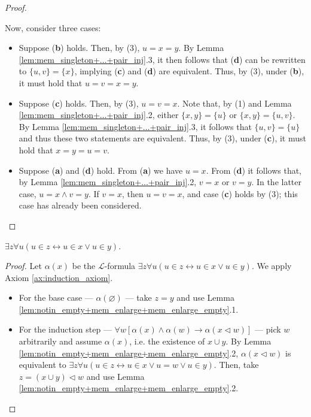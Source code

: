 \begin{proof}
\begin{enumerate}
        Now, consider three cases:
        \begin{itemize}
            \item Suppose (\textbf{b}) holds. Then, by (3), $u=x=y$. 
            By Lemma \ref{lem:mem_singleton+...+pair_inj}.3, it then follows that 
            (\textbf{d}) can be rewritten to $\{u,v\}=\{x\}$, 
            implying (\textbf{c}) and (\textbf{d}) are equivalent.
            Thus, by (3), under (\textbf{b}), it must hold that $u=v=x=y$.
            \item Suppose (\textbf{c}) holds. 
            Then, by (3), $u=v=x$. 
            Note that, by (1) and Lemma \ref{lem:mem_singleton+...+pair_inj}.2, 
            either $\{x,y\}=\{u\}$ or $\{x,y\}=\{u,v\}$.  
            By Lemma \ref{lem:mem_singleton+...+pair_inj}.3, it follows that $\{u,v\}=\{u\}$ and 
            thus these two statements are equivalent. 
            Thus, by (3), under (\textbf{c}), it must hold that $x=y=u=v$.
            \item Suppose (\textbf{a}) and (\textbf{d}) hold. From (\textbf{a}) we have $u=x$. 
            From (\textbf{d}) it follows that, by 
            Lemma \ref{lem:mem_singleton+...+pair_inj}.2, $v=x$ or $v=y$. 
            In the latter case, $u=x\land v=y$. 
            If $v=x$, then $u=v=x$, and case (\textbf{c}) holds by (3); 
            this case has already been considered.
        \end{itemize}
    \end{enumerate}
\end{proof}

\begin{theorem}
    \label{thm:exists_union}
    \leanok
    $\exists z \forall u (u \in z \leftrightarrow u \in x \lor u \in y)$.
\end{theorem}

\begin{proof}
    \leanok
    Let $\alpha (x)$ be the $\mathcal{L}$-formula 
    $\exists z \forall u (u \in z \leftrightarrow u \in x \lor u \in y)$.
    We apply Axiom \ref{ax:induction_axiom}.
    \begin{itemize}
        \item For the base case — $\alpha (\varnothing)$ — take $z=y$ and use 
        Lemma \ref{lem:notin_empty+mem_enlarge+mem_enlarge_empty}.1.
        \item For the induction step 
        — $\forall w[\alpha(x) \land \alpha(w) \rightarrow \alpha(x \lhd w)]$ — 
        pick $w$ arbitrarily and assume $\alpha(x)$, i.e. the existence of $x \cup y$. 
        By Lemma \ref{lem:notin_empty+mem_enlarge+mem_enlarge_empty}.2, 
        $\alpha(x \lhd w)$ is equivalent to 
        $\exists z \forall u (u \in z \leftrightarrow u \in x \lor u = w \lor u \in y)$.
        Then, take $z= (x \cup y) \lhd w$ and use 
        Lemma \ref{lem:notin_empty+mem_enlarge+mem_enlarge_empty}.2.
    \end{itemize}
\end{proof}

